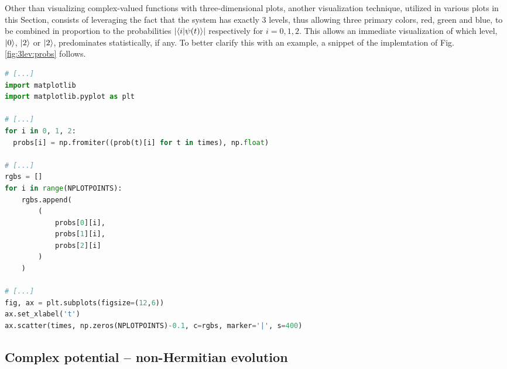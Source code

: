 Other than visualizing complex-valued functions with three-dimensional plots,
another visualization technique, utilized in various plots in this Section,
consists of leveraging
the fact that the system has exactly 3 levels,
thus allowing three primary colors, red, green and blue, to be combined
in proportion to the probabilities $\abs{\braket{i}{\psi(t)}}$
respectively for $i = 0, 1, 2$. This allows an immediate visualization
of which level, $\ket{0}$, $\ket{2}$ or $\ket{2}$, predominates statistically, if any.
To better clarify this with an example,
a snippet of the implemtation of Fig. \ref{fig:3lev:probs} follows.
\begin{lstlisting}[language=Python]
# [...]
import matplotlib
import matplotlib.pyplot as plt

# [...]
for i in 0, 1, 2:
  probs[i] = np.fromiter((prob(t)[i] for t in times), np.float)

# [...]
rgbs = []
for i in range(NPLOTPOINTS):
    rgbs.append(
        (
            probs[0][i],
            probs[1][i],
            probs[2][i]
        )
    )

# [...]
fig, ax = plt.subplots(figsize=(12,6))
ax.set_xlabel('t')
ax.scatter(times, np.zeros(NPLOTPOINTS)-0.1, c=rgbs, marker='|', s=400)
\end{lstlisting}


\subsection{Complex potential -- non-Hermitian evolution}\label{sec:3lev:complexPotential}

